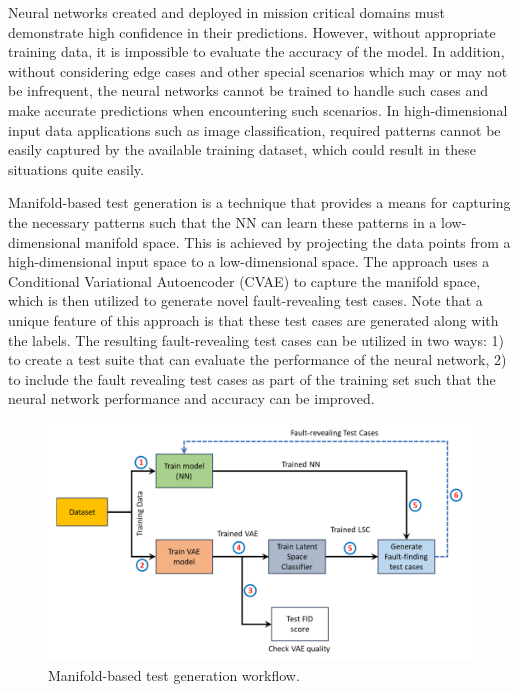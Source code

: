 Neural networks created and deployed in mission critical domains must demonstrate high confidence in their predictions. However, without appropriate training data, it is impossible to evaluate the accuracy of the model. In addition, without considering edge cases and other special scenarios which may or may not be infrequent, the neural networks cannot be trained to handle such cases and make accurate predictions when encountering such scenarios. In high-dimensional input data applications such as image classification, required patterns cannot be easily captured by the available training dataset, which could result in these situations quite easily. 

Manifold-based test generation is a technique that provides a means for capturing the necessary patterns such that the NN can learn these patterns in a low-dimensional manifold space. This is achieved by projecting the data points from a high-dimensional input space to a low-dimensional space. The approach uses a Conditional Variational Autoencoder (CVAE) to capture the manifold space, which is then utilized to generate novel fault-revealing test cases. Note that a unique feature of this approach is that these test cases are generated along with the labels. The resulting fault-revealing test cases can be utilized in two ways: 1) to create a test suite that can evaluate the performance of the neural network, 2) to include the fault revealing test cases as part of the training set such that the neural network performance and accuracy can be improved.

\begin{figure}[h]
	\includegraphics[width=\linewidth]{Fig/manifold_workflow.pdf}
	\caption{Manifold-based test generation workflow.}
	\label{fig:manifold_workflow}
\end{figure}

